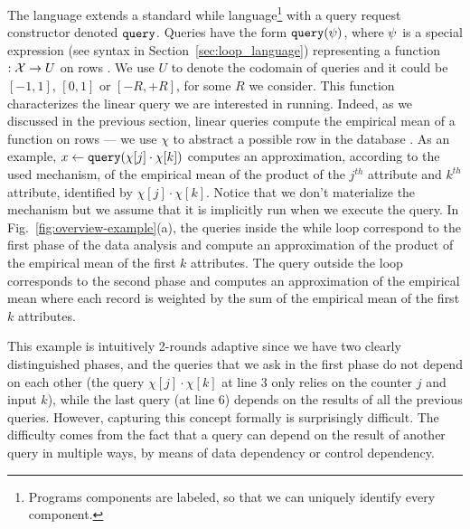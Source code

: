 The {\THESYSTEM} language extends a standard while language\footnote{Programs components are labeled, so that we can uniquely identify every component.} with a query request constructor denoted ${\tt query}$.
 Queries have the form ${\tt query}(\psi)$, where $\psi$ is a special expression (see syntax in Section~\ref{sec:loop_language}) 
representing a function $: \mathcal{X} \to U$ on rows .
We use $U$ to denote the codomain of queries and it could be $[-1,1]$, $[0,1]$ or $[-R,+R]$, for some $R$ we consider. This function characterizes the linear query we are interested in running. Indeed, as we discussed in the previous section, linear queries compute the empirical mean of a function on rows 
--- we use $\chi$ to abstract a possible row in the database .
 As an example, $x \leftarrow {\tt query}(\chi[j] \cdot \chi[k])$ computes an approximation, according to the used mechanism, of the empirical mean of the product of the $j^{th}$ attribute and $k^{th}$ attribute, identified by $\chi[j] \cdot \chi[k]$. Notice that we don't materialize the mechanism but we assume that it is implicitly run when we execute the query. 
 In Fig.~\ref{fig:overview-example}(a), the queries inside the while loop correspond to the first phase of the data analysis and compute an approximation of 
the product of the empirical mean of the first $k$ attributes. 
The query outside the loop corresponds to the second phase and computes an approximation of the empirical mean where each record is weighted by the sum of the empirical mean of the first $k$ attributes.


This example is intuitively 2-rounds adaptive since we have two clearly distinguished phases, and the queries that we ask in the first phase do not depend on each other (the query $\chi[j] \cdot \chi[k]$ at line $3$ only relies on the counter $j$ and input $k$), while the last query 
(at line 6) depends on the results of all the previous queries. 
However, capturing this concept formally is surprisingly difficult. The difficulty comes from the fact that a query can depend on the result of another query in multiple ways, by means of data dependency or control dependency.

